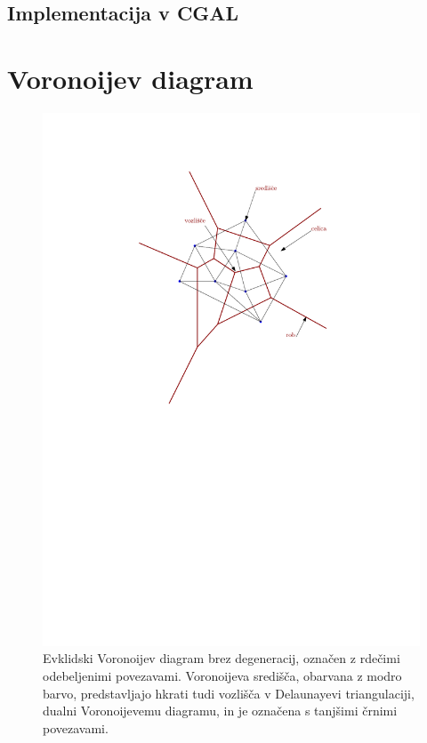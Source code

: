 \documentclass[a4paper, 12pt]{book}
\begin{document}
\subsection{Implementacija v CGAL}


\section{Voronoijev diagram}
\begin{figure}
\centerline{\includegraphics[scale=1.2]{pics/voronoi-dt2.pdf}}
\caption{Evklidski Voronoijev diagram brez degeneracij, označen z rdečimi odebeljenimi povezavami. Voronoijeva središča, obarvana z modro barvo, predstavljajo hkrati tudi vozlišča v Delaunayevi triangulaciji, dualni Voronoijevemu diagramu, in je označena s tanjšimi črnimi povezavami.}
\label{vd}
\end{figure}
\end{document}
